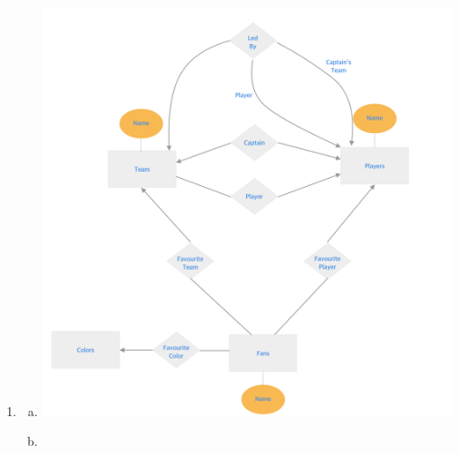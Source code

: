 \documentclass[12pt]{article}
\begin{document}
\begin{enumerate}[1.]
\begin{mdframed}
    \end{mdframed}

    \item


    \begin{enumerate}[a)]
        \item

        \begin{center}
        \includegraphics[width=\linewidth]{images/worksheet_14_solution_25.png}
        \end{center}

        \item


\end{enumerate}
\end{enumerate}
\end{document}
